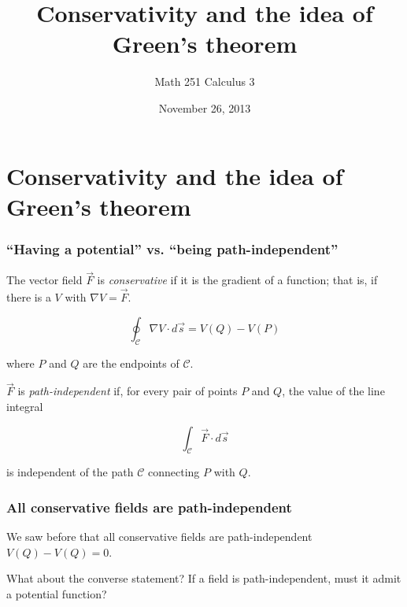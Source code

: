 \documentclass[11pt,ignorenonframetext,aspectratio=169,xcolor={svgnames}]{beamer}
\title{Conservativity and the idea of Green's theorem}
\author{Math 251 Calculus 3}
\date{November 26, 2013}
\begin{document}
\frame{\titlepage}

\section{Conservativity and the idea of Green's theorem}

\begin{frame}\frametitle{``Having a potential'' vs. ``being
path-independent''}

\begin{minipage}[t]{0.45\linewidth}
\vspace{0pt}
The vector field $\vec{F}$ is \emph{conservative} if it is the gradient
of a function; that is, if there is a $V$ with $\nabla V = \vec{F}$.

\begin{equation*}
    \oint_{\mathcal{C}} \nabla V \cdot d\vec{s} = V(Q) - V(P)
\end{equation*}

where $P$ and $Q$ are the endpoints of $\mathcal{C}$.
\end{minipage}
\hspace{1cm}
\begin{minipage}[t]{0.45\linewidth}
\vspace{0pt}
$\vec{F}$ is \emph{path-independent} if, for every pair of points $P$
and $Q$, the value of the line integral

\begin{equation*}
    \int_{\mathcal{C}} \vec{F} \cdot d\vec{s}
\end{equation*}

is independent of the path $\mathcal{C}$ connecting $P$ with $Q$.
\end{minipage}

\end{frame}

\begin{frame}\frametitle{All conservative fields are path-independent}

We saw before that all conservative fields are path-independent
$V(Q) - V(Q) = 0$.

What about the converse statement? If a field is path-independent, must
it admit a potential function?

\end{frame}
\end{document}
